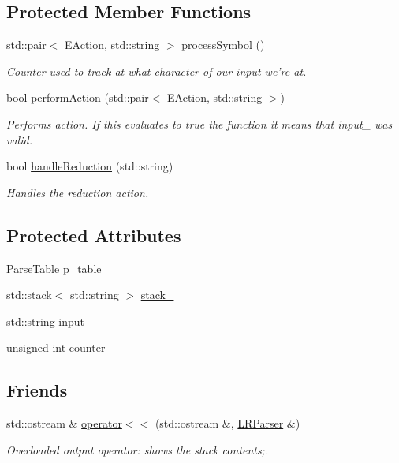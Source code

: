 \subsection*{Protected Member Functions}
\begin{DoxyCompactItemize}
\item 
std\-::pair$<$ \hyperlink{ParseTable_8h_a81d4868b129e5f45325894085a36a8a5}{E\-Action}, std\-::string $>$ \hyperlink{classLRParser_a3bd6bff5276c4ee9b592a14e31e789b3}{process\-Symbol} ()
\begin{DoxyCompactList}\small\item\em Counter used to track at what character of our input we're at. \end{DoxyCompactList}\item 
bool \hyperlink{classLRParser_aa2a11e0af8cbc1bb23b522f1a2ca87e5}{perform\-Action} (std\-::pair$<$ \hyperlink{ParseTable_8h_a81d4868b129e5f45325894085a36a8a5}{E\-Action}, std\-::string $>$)
\begin{DoxyCompactList}\small\item\em Performs action. If this evaluates to true the function it means that input\-\_\- was valid. \end{DoxyCompactList}\item 
bool \hyperlink{classLRParser_ab355d762edcb2c7da1f30728d08b43a1}{handle\-Reduction} (std\-::string)
\begin{DoxyCompactList}\small\item\em Handles the reduction action. \end{DoxyCompactList}\end{DoxyCompactItemize}
\subsection*{Protected Attributes}
\begin{DoxyCompactItemize}
\item 
\hyperlink{classParseTable}{Parse\-Table} \hyperlink{classLRParser_a111f4dd04eb42896c7c31bd1a255a58b}{p\-\_\-table\-\_\-}
\item 
std\-::stack$<$ std\-::string $>$ \hyperlink{classLRParser_a98af41152079cb4f2fe7f280629cf18c}{stack\-\_\-}
\item 
std\-::string \hyperlink{classLRParser_a8dc38b1c7c3a3aa80abbd48ee2364319}{input\-\_\-}
\item 
unsigned int \hyperlink{classLRParser_acd3eab842429e90bd7dc0433274e0a37}{counter\-\_\-}
\end{DoxyCompactItemize}
\subsection*{Friends}
\begin{DoxyCompactItemize}
\item 
std\-::ostream \& \hyperlink{classLRParser_a9f53bcd94244f30103c9756aabf51d38}{operator$<$$<$} (std\-::ostream \&, \hyperlink{classLRParser}{L\-R\-Parser} \&)
\begin{DoxyCompactList}\small\item\em Overloaded output operator\-: shows the stack contents;. \end{DoxyCompactList}\end{DoxyCompactItemize}



